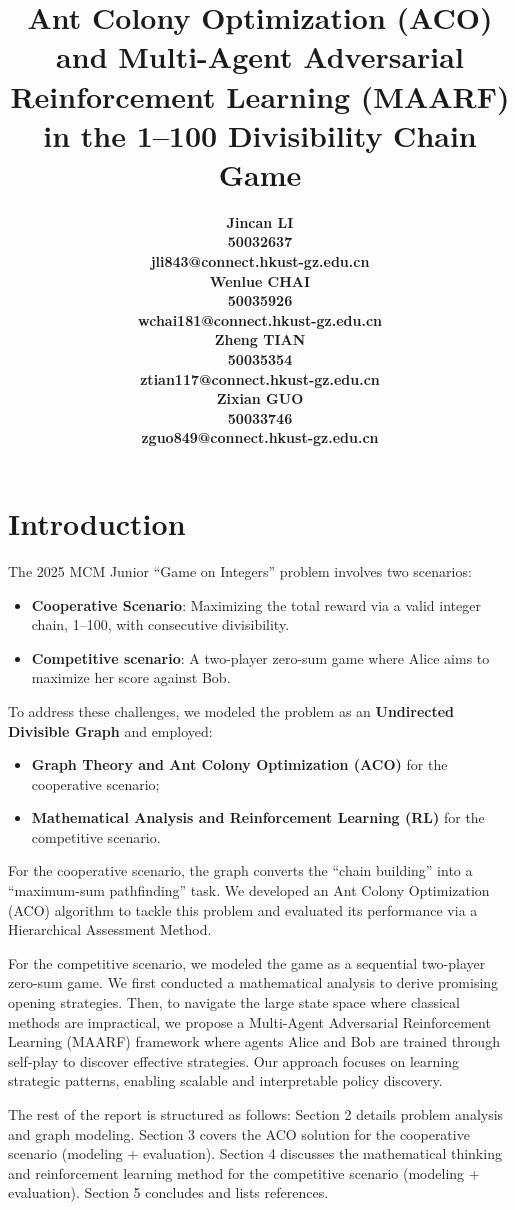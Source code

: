 \documentclass[twocolumn, a4paper]{article}
\title{Ant Colony Optimization (ACO) and Multi-Agent Adversarial Reinforcement Learning (MAARF) in the 1--100 Divisibility Chain Game}
\author{
    \begin{minipage}[t]{0.23\textwidth}
        \centering
        \small\bfseries Jincan LI\\
        \tiny 50032637\\
        \tiny jli843@connect.hkust-gz.edu.cn
    \end{minipage}
    \hfill
    \begin{minipage}[t]{0.23\textwidth}
        \centering
        \small\bfseries Wenlue CHAI\\
        \tiny 50035926\\
        \tiny wchai181@connect.hkust-gz.edu.cn
    \end{minipage}
    \hfill
    \begin{minipage}[t]{0.23\textwidth}
        \centering
        \small\bfseries Zheng TIAN\\
        \tiny 50035354\\
        \tiny ztian117@connect.hkust-gz.edu.cn
    \end{minipage}
    \hfill
    \begin{minipage}[t]{0.23\textwidth}
        \centering
        \small\bfseries Zixian GUO\\
        \tiny 50033746\\
        \tiny zguo849@connect.hkust-gz.edu.cn
    \end{minipage}
}
\date{} %
\begin{document}
\maketitle


\section{Introduction}
The 2025 MCM Junior ``Game on Integers'' problem involves two scenarios: 
\begin{itemize}
    \item \textbf{Cooperative Scenario}: Maximizing the total reward via a valid integer chain, 1--100, with consecutive divisibility.
    \item \textbf{Competitive scenario}: A two-player zero-sum game where Alice aims to maximize her score against Bob.
\end{itemize}
To address these challenges, we modeled the problem as an \textbf{Undirected Divisible Graph} and employed:
\begin{itemize}
    \item \textbf{Graph Theory and Ant Colony Optimization (ACO)} for the cooperative scenario; 
    \item \textbf{Mathematical Analysis and Reinforcement Learning (RL)} for the competitive scenario.
\end{itemize}

For the cooperative scenario, the graph converts the ``chain building'' into a ``maximum-sum pathfinding'' task. We developed an Ant Colony Optimization (ACO) algorithm to tackle this problem and evaluated its performance via a Hierarchical Assessment Method.

For the competitive scenario, we modeled the game as a sequential two-player zero-sum game. We first conducted a mathematical analysis to derive promising opening strategies. Then, to navigate the large state space where classical methods are impractical, we propose a Multi-Agent Adversarial Reinforcement Learning (MAARF) framework where agents Alice and Bob are trained through self-play to discover effective strategies. Our approach focuses on learning strategic patterns, enabling scalable and interpretable policy discovery.

The rest of the report is structured as follows: Section 2 details problem analysis and graph modeling. Section 3 covers the ACO solution for the cooperative scenario (modeling + evaluation). Section 4 discusses the mathematical thinking and reinforcement learning method for the competitive scenario (modeling + evaluation). Section 5 concludes and lists references.
\end{document}
